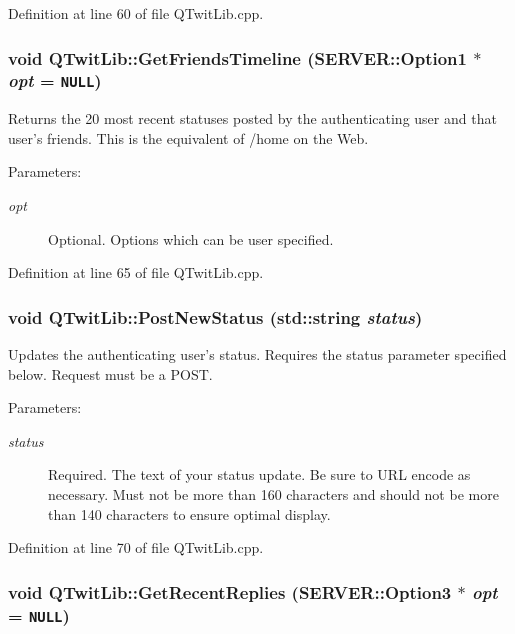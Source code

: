 Definition at line 60 of file QTwitLib.cpp.\hypertarget{classQTwitLib_a6d4b6755131819aa80b23050b0f2e90}{
\subsubsection{\setlength{\rightskip}{0pt plus 5cm}void QTwitLib::GetFriendsTimeline ({\bf SERVER::Option1} $\ast$ {\em opt} = {\tt NULL})}}
\label{classQTwitLib_a6d4b6755131819aa80b23050b0f2e90}


Returns the 20 most recent statuses posted by the authenticating user and that user's friends. This is the equivalent of /home on the Web. \begin{Desc}
\item[Parameters:]
\begin{description}
\item[{\em opt}]Optional. Options which can be user specified. \end{description}
\end{Desc}


Definition at line 65 of file QTwitLib.cpp.\hypertarget{classQTwitLib_c22d0aa3bde76fba0ce2d45179d1494b}{
\subsubsection{\setlength{\rightskip}{0pt plus 5cm}void QTwitLib::PostNewStatus (std::string {\em status})}}
\label{classQTwitLib_c22d0aa3bde76fba0ce2d45179d1494b}


Updates the authenticating user's status. Requires the status parameter specified below. Request must be a POST. \begin{Desc}
\item[Parameters:]
\begin{description}
\item[{\em status}]Required. The text of your status update. Be sure to URL encode as necessary. Must not be more than 160 characters and should not be more than 140 characters to ensure optimal display. \end{description}
\end{Desc}


Definition at line 70 of file QTwitLib.cpp.\hypertarget{classQTwitLib_60fc1eae15a11b68583c6610aaaccec3}{
\subsubsection{\setlength{\rightskip}{0pt plus 5cm}void QTwitLib::GetRecentReplies ({\bf SERVER::Option3} $\ast$ {\em opt} = {\tt NULL})}}
\label{classQTwitLib_60fc1eae15a11b68583c6610aaaccec3}



